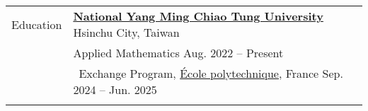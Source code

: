 \documentclass[letterpaper, 11pt]{article}
\begin{document}
\setlength{\tabcolsep}{8pt}
\vspace{-1.5em}
\begin{center}
    \begin{longtable}{p{0.76in}p{5.93in}}

        
        
        
        \textcolor{OliveGreen}{Education} 
        & \href{https://www.nycu.edu.tw/nycu/en/index}{\textbf{National Yang Ming Chiao Tung University}} \hfill Hsinchu City, Taiwan \\ 
        & Applied Mathematics 
            \hfill Aug. 2022 -- Present \\
        & \qquad \  Exchange Program, \href{https://www.polytechnique.edu}{\'Ecole polytechnique}, France \hfill Sep. 2024 -- Jun. 2025 \\
        & \\
        
        
        

\end{longtable}
\end{center}
\end{document}
